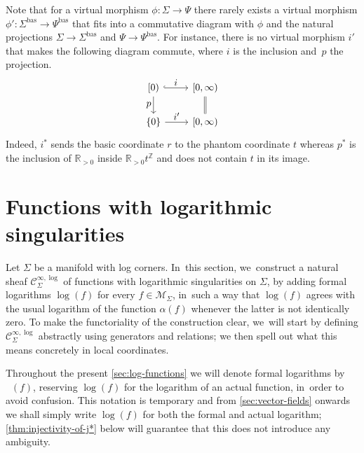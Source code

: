 \documentclass[JEP,XML,SOM,Unicode,NoFloatCountersInSection,published]{cedram}
\let\tst\textstyle
\theoremstyle{definition}
\theoremstyle{remark}
\newenvironment{remark}
  {\pushQED{\qed}\renewcommand{\qedsymbol}{$\lozenge$}\remarkx}
  {\popQED\endremarkx}
\newcommand{\RR}{\mathbb{R}}
\newcommand{\ZZ}{\mathbb{Z}}
\newcommand{\ulog}{\mathop{\widetilde{\log}}\nolimits}
\newcommand{\cM}{\mathscr{M}}
\newcommand{\Cinflog}[1]{\mathscr{C}^{\infty,\log}_{#1}}
\newcommand{\Sig}{\Sigma}
\newcommand{\bas}[1]{{#1}^{\mathrm{bas}}}
\newcommand{\Sigbas}{\bas{\Sig}}
\newcommand{\Psibas}{\bas{\Psi}}
\begin{document}
\begin{remark}
Note that for a virtual morphism $\phi:\Sig\to\Psi$ there rarely exists a virtual morphism $\phi':\Sigbas\to \Psibas$ that fits into a commutative diagram with $\phi$ and the natural projections $\Sig\to\Sigbas$ and $\Psi\to\Psibas$. For instance, there is no virtual morphism $i'$ that makes the following diagram commute, where $i$ is the inclusion and~$p$ the projection.
\begin{equation*}
\begin{tikzcd}
{[0)} \ar[r,"\tst i",hook] \ar[d,"\tst p"'] & {[0,\infty)} \ar[d,equal] \\
\{0\} \ar[r,"\tst i'"]& {[0,\infty)}
\end{tikzcd}
\end{equation*}
Indeed, $i^*$ sends the basic coordinate $r$ to the phantom coordinate $t$ whereas $p^*$ is the inclusion of $\RR_{>0}$ inside $\RR_{>0}t^\ZZ$ and does not contain $t$ in its image.
\end{remark}

\section{Functions with logarithmic singularities}
\label{sec:log-functions}
Let $\Sig$ be a manifold with log corners. In~this section, we~construct a natural sheaf $\Cinflog{\Sig}$ of functions with logarithmic singularities on $\Sig$, by adding formal logarithms $\log(f)$ for every $f \in \cM_{\Sig}$, in~such a way that $\log(f)$ agrees with the usual logarithm of the function $\alpha(f)$ whenever the latter is not identically zero. To make the functoriality of the construction clear, we~will start by defining $\Cinflog{\Sig}$ abstractly using generators and relations; we then spell out what this means concretely in local coordinates.

Throughout the present \autoref{sec:log-functions} we will denote formal logarithms by $\ulog(f)$, reserving $\log(f)$ for the logarithm of an actual function, in~order to avoid confusion. This notation is temporary and from \autoref{sec:vector-fields} onwards we shall simply write $\log(f)$ for both the formal and actual logarithm; \autoref{thm:injectivity-of-j*} below will guarantee that this does not introduce any ambiguity.
\end{document}
